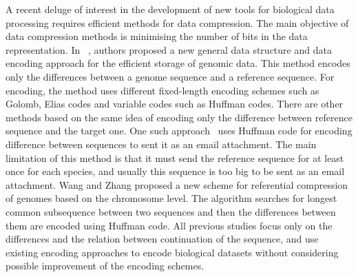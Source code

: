 \documentclass[preprint,12pt]{elsarticle}%
\begin{document}
A recent deluge of interest in the development of new tools for biological data processing requires efficient methods for data compression. The main objective of data compression methods is minimising the number of bits in the data representation. 
In ~\cite{bra09}, authors proposed a new general data structure and data encoding approach for the efficient storage of genomic data. This method encodes only the differences between a genome sequence and a reference sequence. For encoding, the method uses different fixed-length encoding schemes such as Golomb\cite{Golomb96}, Elias codes\cite{Elias75} and variable codes such as Huffman codes. There are other methods based on the same idea of encoding only the difference between reference sequence and the target one. One such approach~\cite{chr09} uses Huffman code for encoding difference between sequences to sent it as an email attachment. The main limitation of this method is that it must send the reference sequence for at least once for each species, and usually this sequence is too big to be sent as an email attachment.
Wang and Zhang \cite{wan11} proposed a new scheme for referential compression of genomes based on the chromosome level. The algorithm searches for longest common subsequence between two sequences and then the differences between them are encoded using Huffman code.
All previous studies focus only on the differences and the relation between continuation of the sequence, and use existing encoding approaches to encode biological datasets without considering possible improvement of the encoding schemes.

\end{document}
